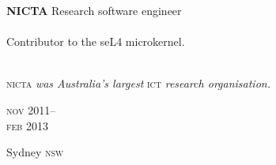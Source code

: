 


\begin{minipage}[t]{\mainboxwidth\textwidth}
\textbf{NICTA}\phantom{..} Research software engineer\\
\\
{\small Contributor to the seL4 microkernel.} \\
\\
{\small
\textsc{nicta}\textit{ was Australia's largest} \textsc{ict} \textit{research organisation.}
\par}
\end{minipage}
\begin{minipage}[t]{\detailboxwidth\textwidth}
{
\hfill \textsc{nov} 2011--\\ 
\hspace*{0pt} \hfill \textsc{feb} 2013
\par
{\small\hfill Sydney \textsc{nsw}}
}
\end{minipage}


